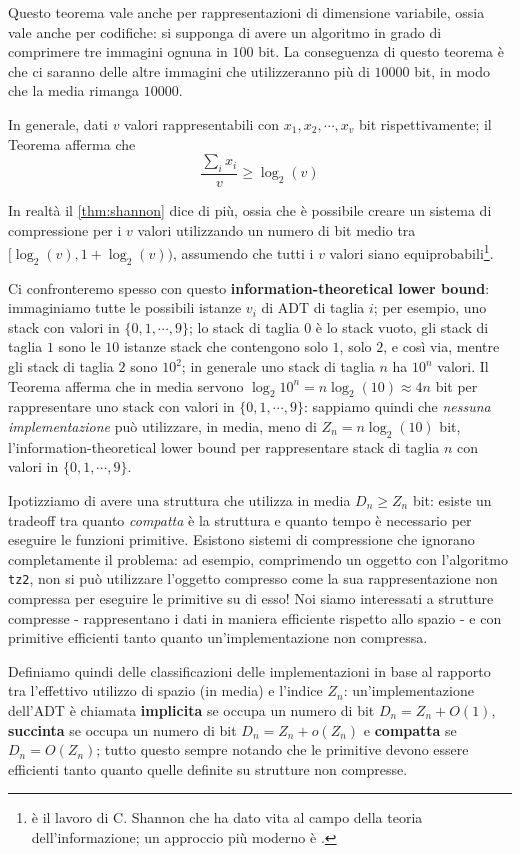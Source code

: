Questo teorema vale anche per rappresentazioni di dimensione
variabile, ossia vale anche per codifiche: si supponga di avere un
algoritmo in grado di comprimere tre immagini ognuna in $100$ bit.
La conseguenza di questo teorema è che ci saranno delle altre immagini che
utilizzeranno più di $10000$ bit, in modo che la media rimanga $10000$.

In generale, dati $v$ valori rappresentabili con $x_1, x_2, \cdots, x_v$ bit
rispettivamente; il Teorema afferma che
$$
	\frac{\sum_{i} x_i}{v} \geq \log_2(v)
$$

In realtà il \cref{thm:shannon} dice di più, ossia che è possibile creare un
sistema di compressione per i $v$ valori utilizzando un numero di bit medio
tra $[\log_2(v), 1 + \log_2(v))$, assumendo che tutti i $v$ valori siano
equiprobabili\footnote{
	\cite{shannon_1948} è il lavoro di C. Shannon che ha dato vita al campo della
	teoria dell'informazione; un approccio più moderno è \cite{cover_2006}. }.

Ci confronteremo spesso con questo \textbf{information-theoretical lower bound}:
immaginiamo tutte le possibili istanze $v_i$ di ADT di taglia $i$;
per esempio, uno stack con valori in $\{0, 1, \cdots, 9\}$;
lo stack di taglia $0$ è lo stack vuoto, gli stack
di taglia $1$ sono le $10$ istanze stack che contengono solo $1$, solo $2$, e così via,
mentre gli stack di taglia $2$ sono $10^2$; in generale uno stack
di taglia $n$ ha $10^n$ valori. Il Teorema afferma che in media servono
$\log_2{10^n} = n \log_2(10) \approx 4n$ bit per rappresentare uno stack
con valori in $\{0, 1, \cdots, 9\}$: sappiamo quindi che
\textit{nessuna implementazione} può utilizzare, in media, meno di
$Z_n =n \log_2(10)$ bit, l'information-theoretical lower bound per
rappresentare stack di taglia $n$ con valori in $\{0, 1, \cdots, 9\}$.

Ipotizziamo di avere una struttura che utilizza in media $D_n \geq Z_n$ bit:
esiste un tradeoff tra quanto \textit{compatta} è la struttura e quanto
tempo è necessario per eseguire le funzioni primitive.
Esistono sistemi di compressione che ignorano completamente il problema:
ad esempio, comprimendo un oggetto con l'algoritmo \texttt{tz2}, non si può
utilizzare l'oggetto compresso come la sua rappresentazione non compressa
per eseguire le primitive su di esso! Noi siamo interessati a strutture
compresse - rappresentano i dati in maniera efficiente rispetto allo spazio -
e con primitive efficienti tanto quanto un'implementazione non compressa.

Definiamo quindi delle classificazioni delle implementazioni in base al rapporto
tra l'effettivo utilizzo di spazio (in media) e l'indice $Z_n$:
un'implementazione dell'ADT è chiamata \textbf{implicita} se occupa un numero
di bit $D_n = Z_n + O(1)$, \textbf{succinta} se occupa un numero di bit
$D_n = Z_n + o(Z_n)$ e \textbf{compatta} se $D_n = O(Z_n)$; tutto questo sempre
notando che le primitive devono essere efficienti tanto quanto quelle definite
su strutture non compresse.

